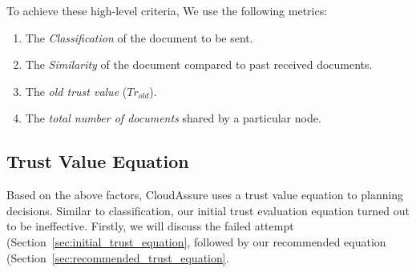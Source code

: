 To achieve these high-level criteria, We use the following metrics:
\begin{enumerate}
    \item The \emph{Classification} of the document to be sent.
    \item The \emph{Similarity} of the document compared to past received
        documents.
    \item The \emph{old trust value} (\(Tr_{old}\)).
    \item The \emph{total number of documents} shared by a particular node.
\end{enumerate}

\subsection{Trust Value Equation}
Based on the above factors, CloudAssure uses a trust value equation to planning 
decisions. Similar to classification, our initial trust evaluation equation
turned out to be ineffective. Firstly, we will discuss the failed attempt
(Section~\ref{sec:initial_trust_equation}, followed by our recommended equation
(Section~\ref{sec:recommended_trust_equation}. 

